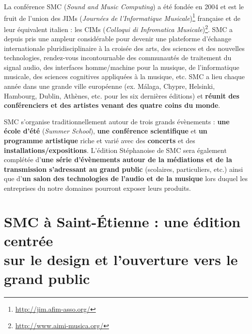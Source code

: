 \documentclass[fontsize=12pt]{scrartcl} %
\numberwithin{equation}{section} %
\numberwithin{figure}{section} %
\numberwithin{table}{section} %
\begin{document}
La conférence SMC (\textit{Sound and Music Computing}) a été fondée en 2004 et est le fruit de l'union des JIMs (\textit{Journées de l'Informatique Musicale})\footnote{\url{http://jim.afim-asso.org/}} française et de leur équivalent italien : les CIMs (\textit{Colloqui di Infromatica Musicale})\footnote{\url{http://www.aimi-musica.org/}}. SMC a depuis pris une ampleur considérable pour devenir une plateforme d’échange internationale pluridisciplinaire à la croisée des arts, des sciences et des nouvelles technologies, rendez-vous incontournable des communautés de traitement du signal audio, des interfaces homme/machine pour la musique, de l'informatique musicale, des sciences cognitives appliquées à la musique, etc. SMC a lieu chaque année dans une grande ville européenne (ex. Málaga, Chypre, Helsinki, Hambourg, Dublin, Athènes, etc. pour les six dernières éditions) et \textbf{réunit des conférenciers et des artistes venant des quatre coins du monde}.


SMC s'organise traditionnellement autour de trois grands évènements : \textbf{une école d'été} (\textit{Summer School}), \textbf{une conférence scientifique} et \textbf{un programme artistique} riche et varié avec des \textbf{concerts} et des \textbf{installations/expositions}. L'édition Stéphanoise de SMC sera également complétée d'\textbf{une série d'évènements autour de la médiations et de la transmission s'adressant au grand public} (scolaires, particuliers, etc.) ainsi que d'\textbf{un salon des technologies de l'audio et de la musique} lors duquel les entreprises du notre domaines pourront exposer leurs produits. 


\section{SMC à Saint-Étienne : une édition centrée\\sur le design et l'ouverture vers le grand public}
\end{document}
